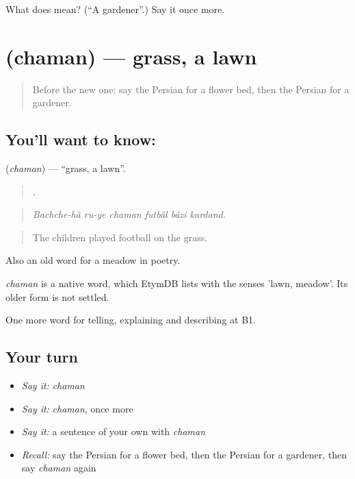 \begin{tcolorbox}[breakable,colback=teal!4,colframe=teal!35!black,title={Before you move on}]
What does  mean? (\textquotedblleft{}A gardener\textquotedblright{}.) Say it once more.
\end{tcolorbox}
\section[\texorpdfstring{\fa{چمن} (chaman)}{چمن (chaman)}]{ (chaman) — grass, a lawn}

\label{lesson:FA-C467-chaman}



\begin{quote}
Before the new one: say the Persian for a flower bed, then the Persian for a gardener.
\end{quote}

\subsection*{You'll want to know: }
\textbf{} (\emph{chaman}) — \textquotedblleft{}grass, a lawn\textquotedblright{}.

\begin{quote}
      .
\end{quote}

\begin{quote}
\emph{Bachche-hâ ru-ye chaman futbâl bâzi kardand.}
\end{quote}

\begin{quote}
The children played football on the grass.
\end{quote}

Also an old word for a meadow in poetry.

\begin{cousinweb}
\emph{chaman} is a native word, which EtymDB lists with the senses 'lawn, meadow'. Its older form is not settled.
\end{cousinweb}

\begin{grammarlens}[title={What you've built}]
One more word for telling, explaining and describing at B1.
\end{grammarlens}

\subsection*{Your turn}
\begin{itemize}
\raggedright
  \item \emph{Say it:} \emph{chaman}
  \item \emph{Say it:} \emph{chaman}, once more
  \item \emph{Say it:} a sentence of your own with \emph{chaman}
  \item \emph{Recall:} say the Persian for a flower bed, then the Persian for a gardener, then say \emph{chaman} again
\end{itemize}

